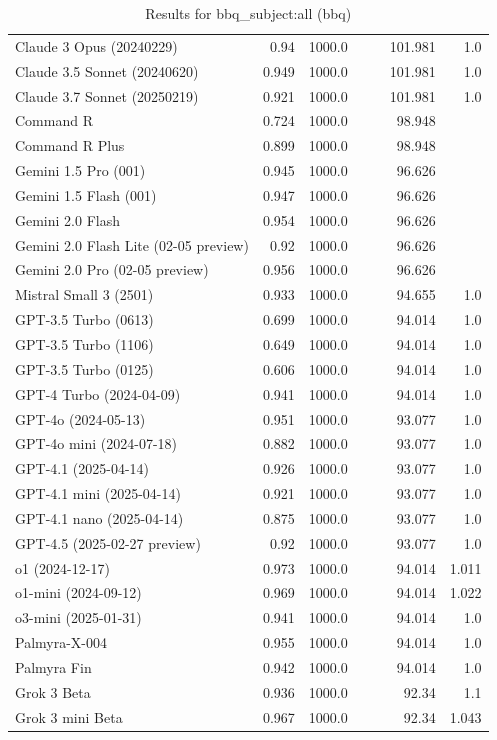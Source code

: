 \begin{table}[htp]
{\begin{tabular}{lrrrrrr}
Claude 3 Opus (20240229) & 0.94 & 1000.0 &  &  & 101.981 & 1.0 \\
Claude 3.5 Sonnet (20240620) & 0.949 & 1000.0 &  &  & 101.981 & 1.0 \\
Claude 3.7 Sonnet (20250219) & 0.921 & 1000.0 &  &  & 101.981 & 1.0 \\
Command R & 0.724 & 1000.0 &  &  & 98.948 &  \\
Command R Plus & 0.899 & 1000.0 &  &  & 98.948 &  \\
Gemini 1.5 Pro (001) & 0.945 & 1000.0 &  &  & 96.626 &  \\
Gemini 1.5 Flash (001) & 0.947 & 1000.0 &  &  & 96.626 &  \\
Gemini 2.0 Flash & 0.954 & 1000.0 &  &  & 96.626 &  \\
Gemini 2.0 Flash Lite (02-05 preview) & 0.92 & 1000.0 &  &  & 96.626 &  \\
Gemini 2.0 Pro (02-05 preview) & 0.956 & 1000.0 &  &  & 96.626 &  \\
Mistral Small 3 (2501) & 0.933 & 1000.0 &  &  & 94.655 & 1.0 \\
GPT-3.5 Turbo (0613) & 0.699 & 1000.0 &  &  & 94.014 & 1.0 \\
GPT-3.5 Turbo (1106) & 0.649 & 1000.0 &  &  & 94.014 & 1.0 \\
GPT-3.5 Turbo (0125) & 0.606 & 1000.0 &  &  & 94.014 & 1.0 \\
GPT-4 Turbo (2024-04-09) & 0.941 & 1000.0 &  &  & 94.014 & 1.0 \\
GPT-4o (2024-05-13) & 0.951 & 1000.0 &  &  & 93.077 & 1.0 \\
GPT-4o mini (2024-07-18) & 0.882 & 1000.0 &  &  & 93.077 & 1.0 \\
GPT-4.1 (2025-04-14) & 0.926 & 1000.0 &  &  & 93.077 & 1.0 \\
GPT-4.1 mini (2025-04-14) & 0.921 & 1000.0 &  &  & 93.077 & 1.0 \\
GPT-4.1 nano (2025-04-14) & 0.875 & 1000.0 &  &  & 93.077 & 1.0 \\
GPT-4.5 (2025-02-27 preview) & 0.92 & 1000.0 &  &  & 93.077 & 1.0 \\
o1 (2024-12-17) & 0.973 & 1000.0 &  &  & 94.014 & 1.011 \\
o1-mini (2024-09-12) & 0.969 & 1000.0 &  &  & 94.014 & 1.022 \\
o3-mini (2025-01-31) & 0.941 & 1000.0 &  &  & 94.014 & 1.0 \\
Palmyra-X-004 & 0.955 & 1000.0 &  &  & 94.014 & 1.0 \\
Palmyra Fin & 0.942 & 1000.0 &  &  & 94.014 & 1.0 \\
Grok 3 Beta & 0.936 & 1000.0 &  &  & 92.34 & 1.1 \\
Grok 3 mini Beta & 0.967 & 1000.0 &  &  & 92.34 & 1.043 \\
\bottomrule
\end{tabular}}
\caption{Results for bbq_subject:all (bbq)}
\label{fig:bbq_subject:all (bbq)}
\end{table}